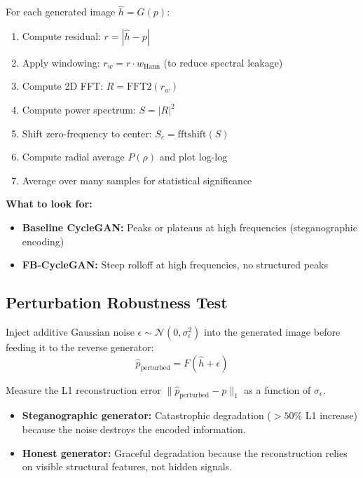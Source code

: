 \documentclass[11pt,a4paper]{article}
\theoremstyle{definition}
\begin{document}
For each generated image $\hat{h} = G(p)$:
\begin{enumerate}
    \item Compute residual: $r = |\hat{h} - p|$
    \item Apply windowing: $r_w = r \cdot w_{\text{Hann}}$ (to reduce spectral leakage)
    \item Compute 2D FFT: $R = \text{FFT2}(r_w)$
    \item Compute power spectrum: $S = |R|^2$
    \item Shift zero-frequency to center: $S_c = \text{fftshift}(S)$
    \item Compute radial average $P(\rho)$ and plot log-log
    \item Average over many samples for statistical significance
\end{enumerate}

\textbf{What to look for:}
\begin{itemize}
    \item \textbf{Baseline CycleGAN:} Peaks or plateaus at high frequencies (steganographic encoding)
    \item \textbf{FB-CycleGAN:} Steep rolloff at high frequencies, no structured peaks
\end{itemize}

\subsection{Perturbation Robustness Test}

Inject additive Gaussian noise $\epsilon \sim \mathcal{N}(0, \sigma_\epsilon^2)$ into the generated image before feeding it to the reverse generator:
\begin{equation}
    \hat{p}_{\text{perturbed}} = F(\hat{h} + \epsilon)
\end{equation}

Measure the L1 reconstruction error $\|\hat{p}_{\text{perturbed}} - p\|_1$ as a function of $\sigma_\epsilon$.

\begin{itemize}
    \item \textbf{Steganographic generator:} Catastrophic degradation ($>50\%$ L1 increase) because the noise destroys the encoded information.
    \item \textbf{Honest generator:} Graceful degradation because the reconstruction relies on visible structural features, not hidden signals.
\end{itemize}
\end{document}
